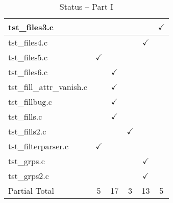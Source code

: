 \begin{table}[H]
\begin{tabular}{|l|c|c|c|c|c|}
tst\_files3.c           &               &               &               &               & $\checkmark$  \\ \hline
tst\_files4.c           &               &               &               & $\checkmark$  &               \\ \hline
tst\_files5.c           & $\checkmark$  &               &               &               &               \\ \hline
tst\_files6.c           &               & $\checkmark$  &               &               &               \\ \hline
tst\_fill\_attr\_vanish.c   &           & $\checkmark$  &               &               &               \\ \hline
tst\_fillbug.c          &               & $\checkmark$  &               &               &               \\ \hline
tst\_fills.c            &               & $\checkmark$  &               &               &               \\ \hline
tst\_fills2.c           &               &               & $\checkmark$  &               &               \\ \hline
tst\_filterparser.c     & $\checkmark$  &               &               &               &               \\ \hline
tst\_grps.c             &               &               &               & $\checkmark$  &               \\ \hline
tst\_grps2.c            &               &               &               & $\checkmark$  &               \\ \hline
Partial Total           &     5         &       17      &       3       &       13      &       5       \\ \hline
\hline
\end{tabular}
\caption{\label{tab:nc_test4_status_1} Status -- Part I}
\end{table}

\clearpage

